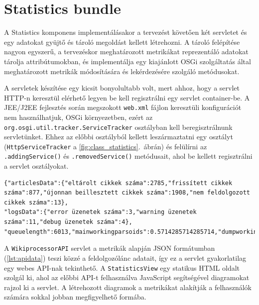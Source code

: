 
\section{Statistics bundle}
\label{sec:statisticsbundle}

A Statistics komponens implementálásakor a tervezést követően két servletet és egy adatokat gyüjtő és tároló megoldást kellett létrehozni. A tároló felépítése nagyon egyszerű, a tervezéskor meghatározott metrikákat reprezentáló adatokat tárolja attribútumokban, és implementálja egy kiajánlott OSGi szolgáltatás által meghatározott metrikák módosítására és lekérdezésére szolgáló metódusokat.

A servletek készítése egy kicsit bonyolultabb volt, mert ahhoz, hogy a servlet HTTP-n keresztül elérhető legyen be kell regisztrálni egy servlet container-be. A JEE/J2EE fejlesztés során megszokott \texttt{web.xml} fájlon keresztüli konfigurációt nem használhatjuk, OSGi környezetben, ezért az \texttt{org.osgi.util.tracker.ServiceTracker} osztályban kell beregisztrálnunk servletünket. Ehhez az előbbi osztályból kellett leszármaztatni egy osztályt (\texttt{HttpServiceTracker} a \ref{fig:class_statistics}.~ábrán) és felülírni az \texttt{.addingService()} és \texttt{.removedService()} metódusait, ahol be kellett regisztrálni a servlet osztályokat.

\begin{lstlisting}[label={lst:apidata}, caption=A WikiprocessorAPI által szolgáltatott adatok,breaklines=true]
{"articlesData":{"eltárolt cikkek száma":2785,"frissített cikkek száma":877,"újonnan beillesztett cikkek száma":1908,"nem feldolgozott cikkek száma":13},
"logsData":{"error üzenetek száma":3,"warning üzenetek száma":11,"debug üzenetek száma":4},
"queuelength":6013,"mainworkingparsoids":0.5714285714285714,"dumpworkingparsoids":0.8,"dumpprocess":0.11469880217730487}
\end{lstlisting}

A \texttt{WikiprocessorAPI} servlet a metrikák alapján JSON formátumban (\ref{lst:apidata}) teszi közzé a feldolgozólánc adatait, így ez a servlet gyakorlatilag egy webes API-nak tekinthető. A \texttt{StatisticsView} egy statikus HTML oldalt szolgál ki, ahol az előbbi API-t felhasználva JavaScript segítségével diagramokat rajzol ki a servlet. A létrehozott diagramok a metrikákat alakítják a felhasználók számára sokkal jobban megfigyelhető formába.


